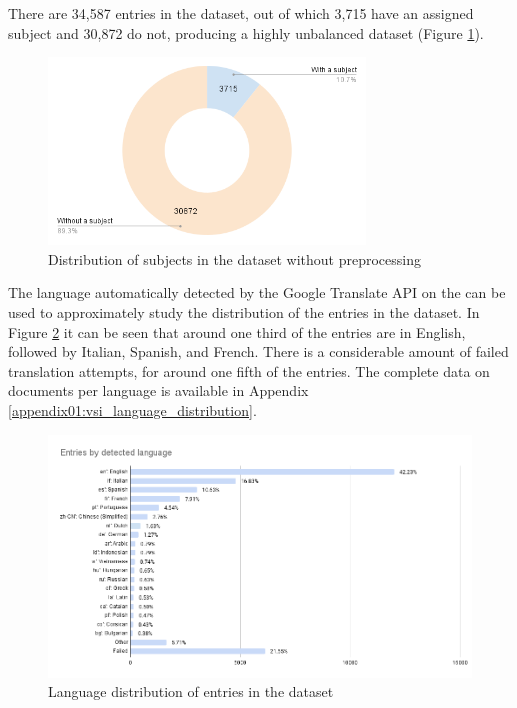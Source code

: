 \label{vsi_data_statistics}

There are 34,587 entries in the dataset, out of which 3,715 have an assigned subject and 30,872 do not, producing a highly unbalanced dataset (Figure \ref{fig:04_naive_positives_and_negatives}). 

\begin{figure}
    \centering
    \includegraphics[width=0.75\textwidth]{Figures/04/naive_positives_and_negatives_chart.png}
    \caption{Distribution of subjects in the \VSI{} dataset without preprocessing}
    \label{fig:04_naive_positives_and_negatives}
\end{figure}

The language automatically detected by the Google Translate API on the \trafilaturaTitle{} can be used to approximately study the distribution of the entries in the dataset. In Figure \ref{fig:04_vsi_language_distribution} it can be seen that around one third of the entries are in English, followed by Italian, Spanish, and French. There is a considerable amount of failed translation attempts, for around one fifth of the entries. The complete data on documents per language is available in Appendix \ref{appendix01:vsi_language_distribution}.
 
\begin{figure}
    \centering
    \includegraphics[width=\textwidth]{Figures/04/Entries by detected language.png}
    \caption{Language distribution of entries in the \VSI{} dataset}
    \label{fig:04_vsi_language_distribution}
\end{figure}

